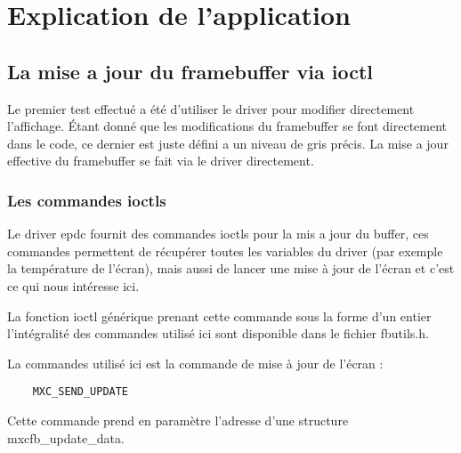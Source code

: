 \chapter{Explication de l'application} %


\section{La mise a jour du framebuffer via ioctl}

Le premier test effectué a été d'utiliser le driver pour modifier directement l'affichage.
Étant donné que les modifications du framebuffer se font directement dans le code, ce dernier est juste défini a un niveau de gris précis. La mise a jour effective du framebuffer se fait via le driver directement.

\subsection{Les commandes ioctls}

Le driver epdc fournit des commandes ioctls pour la mis a jour du buffer, ces commandes 
permettent de récupérer toutes les variables du driver (par exemple la température de l'écran), mais aussi de lancer une mise à jour de l'écran et c'est ce qui nous intéresse ici.

La fonction ioctl générique prenant cette commande sous la forme d'un entier l'intégralité des commandes utilisé ici sont disponible dans le fichier fbutils.h. %


La commandes utilisé ici est la commande de mise à jour de l'écran : 
\begin{lstlisting}
	MXC_SEND_UPDATE
\end{lstlisting}
Cette commande prend en paramètre l'adresse d'une structure mxcfb_update_data.


